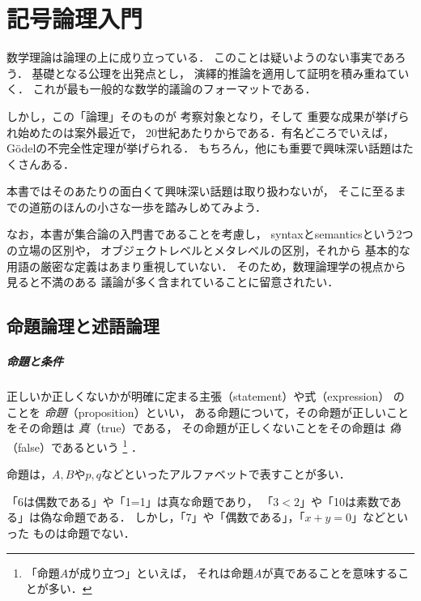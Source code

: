 \chapter{記号論理入門}
\label{chp:sequent}
%

数学理論は論理の上に成り立っている．
このことは疑いようのない事実であろう．
基礎となる公理を出発点とし，
演繹的推論を適用して証明を積み重ねていく．
これが最も一般的な数学的議論のフォーマットである．

しかし，この「論理」そのものが
考察対象となり，そして
重要な成果が挙げられ始めたのは案外最近で，
20世紀あたりからである．有名どころでいえば，
G\"{o}delの不完全性定理が挙げられる．
もちろん，他にも重要で興味深い話題はたくさんある．

本書ではそのあたりの面白くて興味深い話題は取り扱わないが，
そこに至るまでの道筋のほんの小さな一歩を踏みしめてみよう．

なお，本書が集合論の入門書であることを考慮し，
syntaxとsemanticsという2つの立場の区別や，
オブジェクトレベルとメタレベルの区別，それから
基本的な用語の厳密な定義はあまり重視していない．
そのため，数理論理学の視点から見ると不満のある
議論が多く含まれていることに留意されたい．

%
%
%
%
 \section{命題論理と述語論理}
 \label{sec:ronri}
 \paragraph{命題と条件}
  正しいか正しくないかが明確に定まる主張（statement）や式（expression）
  のことを
  \emph{命題}（proposition）といい，
  ある命題について，その命題が正しいことをその命題は %
  \emph{真}（true）である，
  その命題が正しくないことをその命題は %
  \emph{偽}（false）であるという
  \footnote{「命題$A$が成り立つ」といえば，
  それは命題$A$が真であることを意味することが多い．}
  ．
  
  命題は，$A,  B$や$p,  q$などといったアルファベットで表すことが多い．

  \begin{ex}
    「6は偶数である」や「1=1」は真な命題であり，
    「$3<2$」や「10は素数である」は偽な命題である．
    しかし，「7」や「偶数である」，「$x+y=0$」などといった
    ものは命題でない．
  \end{ex}
  
